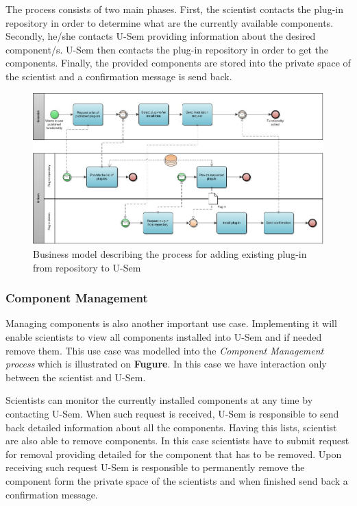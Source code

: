 The process consists of two main phases. First, the scientist contacts the plug-in repository in order to determine what are the currently available components. Secondly, he/she contacts U-Sem providing information about the desired component/s. U-Sem then contacts the plug-in repository in order to get the components. Finally, the provided components are stored into the private space of the scientist and a confirmation message is send back.

\begin{figure}[h!]
  \centering
  	\includegraphics[scale=0.7,angle=90]{plug-in/business_processes/InstallPlugInFromRepoBusinessModel.jpg}
  \caption{Business model describing the process for adding existing plug-in from repository to U-Sem}
\end{figure}

\subsubsection{Component Management}

Managing components is also another important use case. Implementing it will enable scientists to view all components installed into U-Sem and if needed remove them. This use case was modelled into the \textit{Component Management process} which is illustrated on \textbf{Fugure}. In this case we have interaction only between the scientist and U-Sem.

Scientists can monitor the currently installed components at any time by contacting U-Sem. When such request is received, U-Sem is responsible to send back detailed information about all the components. Having this lists, scientist are also able to remove components. In this case scientists have to submit request for removal providing detailed for the component that has to be removed. Upon receiving such request U-Sem is responsible to permanently remove the component form the private space of the scientists and when finished send back a confirmation message.

